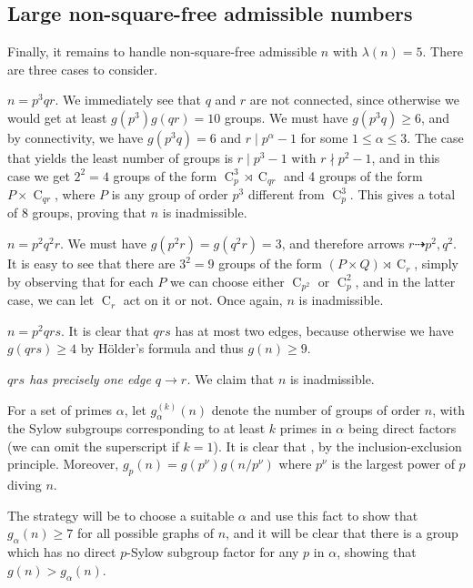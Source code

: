 \documentclass[a4paper, 12pt]{article}
\newcommand{\cyc}[1]{\operatorname{C}_{#1}}
\theoremstyle{plain}
\theoremstyle{definition}
\begin{document}
\subsection{Large non-square-free admissible numbers} 
Finally, it remains to handle non-square-free admissible $n$ with $\lambda(n) = 5$. There are three cases to consider.

 $n = p^3 q r$.
We immediately see that $q$ and $r$ are not connected, since otherwise we would get at least $g(p^3)g(qr) = 10$ groups. We must have $g(p^3 q) \ge 6$, and by connectivity, we have $g(p^3 q) = 6$ and $r \mid p^\alpha - 1$ for some $1 \le \alpha \le 3$. The case that yields the least number of groups is $r \mid p^3 - 1$ with $r \nmid p^2 - 1$, and in this case we get $2^2 = 4$ groups of the form $\cyc{p}^3 \rtimes \cyc{qr}$ and 4 groups of the form $P \times \cyc{qr}$, where $P$ is any group of order $p^3$ different from $\cyc{p}^3$. This gives a total of 8 groups, proving that $n$ is inadmissible.

 $n = p^2 q^2 r$.
We must have $g(p^2 r) = g(q^2 r) = 3$, and therefore arrows $r \dashrightarrow p^2, q^2$. It is easy to see that there are $3^2 = 9$ groups of the form $(P \times Q) \rtimes \cyc{r}$, simply by observing that for each $P$ we can choose either $\cyc{p^2}\text{ or }\cyc{p}^2$, and in the latter case, we can let $\cyc{r}$ act on it or not. Once again, $n$ is inadmissible.
 
 $n = p^2 q r s$. It is clear that $qrs$ has at most two edges, because otherwise we have $g(qrs) \ge 4$ by Hölder's formula and thus $g(n) \ge 9$.


 \emph{$qrs$ has precisely one edge $q \rightarrow r$.} We claim that $n$ is inadmissible.\nopagebreak

For a set of primes $\alpha$, let $g^{(k)}_\alpha(n)$ denote the number of groups of order $n$, with the Sylow subgroups corresponding to at least $k$ primes in $\alpha$ being direct factors (we can omit the superscript if $k = 1$). It is clear that , by the inclusion-exclusion principle. Moreover, $g_p(n) = g(p^\nu)g(n/p^\nu)$ where $p^\nu$ is the largest power of $p$ diving $n$.

The strategy will be to choose a suitable $\alpha$ and use this fact to show that $g_\alpha(n) \ge 7$ for all possible graphs of $n$, and it will be clear that there is a group which has no direct $p$-Sylow subgroup factor for any $p$ in $\alpha$, showing that $g(n) > g_\alpha(n)$.
\end{document}
